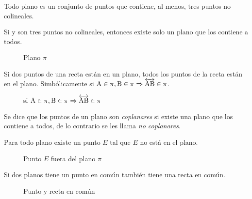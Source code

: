 \begin{postulate}
    Todo plano es un conjunto de puntos que contiene, al menos, tres puntos no colineales.
\end{postulate}

\begin{postulate}
    Si  y  son tres puntos no colineales, entonces existe solo un plano que los contiene a todos.
    
    \begin{figure}[!h]
        \centering
        
        \caption{Plano $\pi$}
        \label{fig:plot5}
    \end{figure}
\end{postulate}

\clearpage

\begin{postulate}
    Si dos puntos de una recta están en un plano, todos los puntos de la recta están en el plano. Simbólicamente si $\rm A \in \pi, \rm B \in \pi \Rightarrow \overleftrightarrow{\rm AB} \in \pi$.
    
    \begin{figure}[!h]
        \centering
        
        \caption{si $\rm A \in \pi, \rm B \in \pi \Rightarrow \overleftrightarrow{\rm AB} \in \pi$}
        \label{fig:plot8}
    \end{figure}
    
\end{postulate}

\begin{definition}
    Se dice que los puntos de un plano son \textit{coplanares} si existe una plano que los contiene a todos, de lo contrario se les llama \textit{no coplanares}.
\end{definition}

\begin{postulate}
    Para todo plano existe un punto $E$ tal que $E$ no está en el plano.
    
    \begin{figure}[!h]
        \centering
        
        \caption{Punto $E$ fuera del plano $\pi$}
        \label{fig:plot7}
    \end{figure}
\end{postulate}

\begin{postulate}
    Si dos planos tiene un punto en común también tiene una recta en común.
    
    \begin{figure}[!h]
        \centering
        
        \caption{Punto y recta en común}
        \label{fig:plot9}
    \end{figure}
    
\end{postulate}

